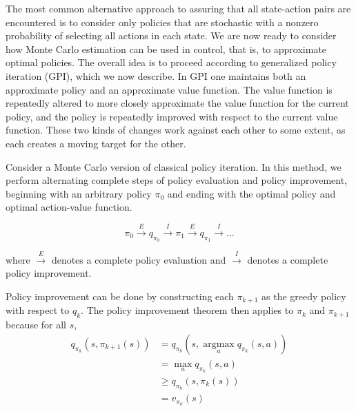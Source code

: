 \documentclass[11pt]{article}
\theoremstyle{plain} %
\theoremstyle{remark}
\begin{document}
The most common alternative approach to assuring that all state-action
        pairs are encountered is to consider only policies that are stochastic with
        a nonzero probability of selecting all actions in each state.  We are now ready to consider how Monte Carlo estimation can be used in
        control, that is, to approximate optimal policies. The overall idea is to proceed according to generalized policy
        iteration (GPI), which we now describe. In GPI one maintains both an approximate policy and an approximate
        value function. The value function is repeatedly altered to more closely approximate
        the value function for the current policy, and the policy is repeatedly
        improved with respect to the current value function. These two kinds of changes work against each other to some extent, as
        each creates a moving target for the other.

Consider a Monte Carlo version of classical policy iteration. In this method, we perform alternating complete steps of policy
        evaluation and policy improvement, beginning with an arbitrary policy
        $\pi_{0}$ and ending with the optimal policy and optimal action-value
        function.

$$
  \pi_{0} \stackrel{E}{\longrightarrow} q_{\pi_{0}} \stackrel{I}{\longrightarrow} \pi_{1} \stackrel{E}{\longrightarrow} q_{\pi_{1}} \stackrel{I}{\longrightarrow} \ldots
$$

where $\stackrel{E}{\longrightarrow}$ denotes a complete policy evaluation and
$\xrightarrow{I}$ denotes a complete policy improvement.

Policy improvement can be done by constructing each $\pi_{k+1}$ as the
        greedy policy with respect to $q_{k}$. The policy improvement theorem then applies to $\pi_{k}$ and
        $\pi_{k+1}$ because for all $s$,
$$
  \begin{aligned}
    q_{\pi_{k}}\left(s, \pi_{k+1}(s)\right) & =q_{\pi_{k}}\left(s, \underset{a}{\operatorname{argmax}} q_{\pi_{k}}(s, a)\right) \\
                                            & =\max _{a} q_{\pi_{k}}(s, a)                                                      \\
                                            & \geq q_{\pi_{k}}\left(s, \pi_{k}(s)\right)                                        \\
                                            & =v_{\pi_{k}}(s)
  \end{aligned}
$$
\end{document}

